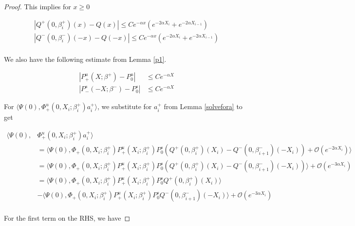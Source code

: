\documentclass[thesis.tex]{subfiles}
\begin{document}
\begin{lemma}
\begin{proof}
This implies for $x \geq 0$

\begin{align*}
|Q^+(0, \beta_i^+)(x) - Q(x)| \leq C e^{-\alpha x} (e^{-2 \alpha X_i} + e^{-2 \alpha X_{i-1}}) \\
|Q^-(0, \beta_i^-)(-x) - Q(-x)| \leq C e^{-\alpha x} (e^{-2 \alpha X_i} + e^{-2 \alpha X_{i-1}}) \\
\end{align*}

We also have the following estimate from Lemma \ref{p1}.

\begin{align*}
|P^u_+(X; \beta^+) - P_0^u| &\leq C e^{-\alpha X} \\
|P^s_-(-X; \beta^-) - P_0^s| &\leq C e^{-\alpha X}
\end{align*}

For $\langle \Psi(0), \Phi^u_+(0, X_i; \beta_i^+) a_i^+ \rangle $, we substitute for $a_i^+$ from Lemma \ref{solvefora} to get

\begin{align*}
\langle \Psi(0), &\Phi^u_+(0, X_i; \beta_i^+) a_i^+ \rangle \\
&= \langle \Psi(0), \Phi_+(0, X_i; \beta_i^+) P^u_+(X_i; \beta_i^+) P^s_0 \left( Q^+(0, \beta_i^+)(X_i) - Q^-(0, \beta_{i+1}^-)(-X_i) \right) 
+ \mathcal{O}( e^{-2 \alpha X_i} ) \rangle \\
&= \langle \Psi(0), \Phi_+(0, X_i; \beta_i^+) P^u_+(X_i; \beta_i^+) P^s_0 \left( Q^+(0, \beta_i^+)(X_i) - Q^-(0, \beta_{i+1}^-)(-X_i) \right) \rangle  
+ \mathcal{O}( e^{-3 \alpha X_i} ) \\
&= \langle \Psi(0), \Phi_+(0, X_i; \beta_i^+) P^u_+(X_i; \beta_i^+) P^s_0 Q^+(0, \beta_i^+)(X_i) \rangle \\
&- \langle \Psi(0), \Phi_+(0, X_i; \beta_i^+) P^u_+(X_i; \beta_i^+) P^s_0 Q^-(0, \beta_{i+1}^-)(-X_i) \rangle
+ \mathcal{O}( e^{-3 \alpha X_i} ) \\
\end{align*}

For the first term on the RHS, we have


\end{proof}
\end{lemma}
\end{document}

